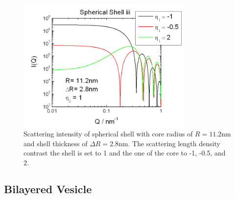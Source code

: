 \begin{figure}[htb]
\begin{center}
\includegraphics[width=0.768\textwidth,height=0.588\textwidth]{../images/form_factor/spheres/shell_iii_P.png}
\end{center}
\caption{Scattering intensity of spherical shell with core radius of $R=11.2$nm
and shell thickness of $\Delta R=2.8$nm. The scattering length density contrast the shell is set to 1
and the one of the core to -1, -0.5, and 2.} \label{fig:I_shell_iii}
\end{figure}
\clearpage



\clearpage
\subsection{Bilayered Vesicle}
\label{sect:BilayeredVesicle} ~\\

